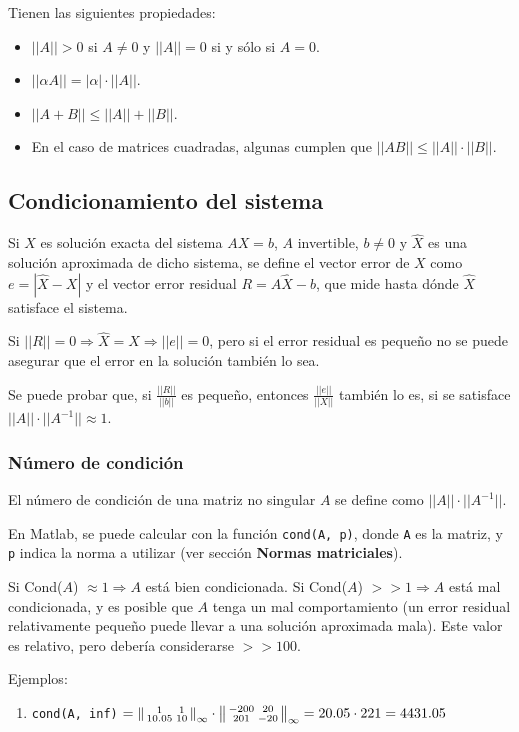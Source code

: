 \documentclass{article}
\begin{document}
Tienen las siguientes propiedades:

\begin{itemize}
    \item $||A||>0$ si $A\neq0$ y $||A||=0$ si y sólo si $A=0$.
    \item $||\alpha A|| = |\alpha|\cdot||A||$.
    \item $||A+B||\leq||A||+||B||$.
    \item En el caso de matrices cuadradas, algunas cumplen que 
        $||AB||\leq||A||\cdot||B||$.
\end{itemize}

\subsection{Condicionamiento del sistema}

Si $X$ es solución exacta del sistema $AX=b$, $A$ invertible, $b\neq0$ y 
$\hat{X}$ es una solución aproximada de dicho sistema, se define el vector error
 de $X$ como $e = |\hat{X} - X|$ y el vector error residual $R=A\hat{X}-b$, que 
 mide hasta dónde $\hat{X}$ satisface el sistema.

Si $||R||=0\Rightarrow\hat{X}=X\Rightarrow||e||=0$, pero si el error residual es
 pequeño no se puede asegurar que el error en la solución también lo sea.

Se puede probar que, si $\frac{||R||}{||b||}$ es pequeño, entonces 
$\frac{||e||}{||X||}$ también lo es, si se satisface 
$||A||\cdot||A^{-1}||\approx1$.

\subsubsection{Número de condición}

El número de condición de una matriz no singular $A$ se define como 
$||A||\cdot||A^{-1}||$.

En Matlab, se puede calcular con la función \verb|cond(A, p)|, donde \verb|A| es
la matriz, y \verb|p| indica la norma a utilizar (ver sección 
\textbf{Normas matriciales}).

Si Cond($A$) $\approx1\Rightarrow A$ está bien condicionada. Si 
Cond($A$) $>> 1\Rightarrow A$ está mal condicionada, y es posible que $A$ tenga 
un mal comportamiento (un error residual relativamente pequeño puede llevar a 
una solución aproximada mala). Este valor es relativo, pero debería 
considerarse $>> 100$.

Ejemplos:
\begin{enumerate}
    \item \verb|cond(A, inf)| $=\begin{Vsmallmatrix}1 & 1\\ 10.05 & 10\end{Vsmallmatrix}_\infty \cdot \begin{Vsmallmatrix}-200 & 20\\ 201 & -20\end{Vsmallmatrix}_\infty = 20.05\cdot221 = 4431.05$
\end{enumerate}
\end{document}
